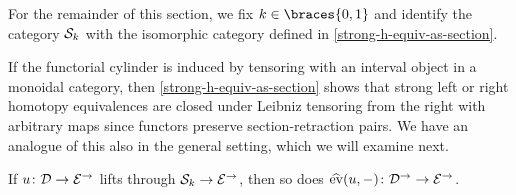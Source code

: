 \documentclass[reqno,10pt,a4paper,oneside,draft]{amsart}
\begin{document}
For the remainder of this section, we fix $k \in \braces{0, 1}$ and identify the category $\cal{S}_k$ with the isomorphic category defined in \cref{strong-h-equiv-as-section}.

If the functorial cylinder is induced by tensoring with an interval object in a monoidal category, then \cref{strong-h-equiv-as-section} shows that strong left or right homotopy equivalences are closed under Leibniz tensoring from the right with arbitrary maps since functors preserve section-retraction pairs.
We have an analogue of this also in the general setting, which we will examine next.

\begin{lemma} \label{leibniz-lift}
If $u \co \cal{D} \to \catE^\to$ lifts through $\cal{S}_k \to \catE^\to$, then so does $\hateval(u, -) \co \cal{D}^\to \to \catE^\to$.
\end{lemma}
\end{document}
